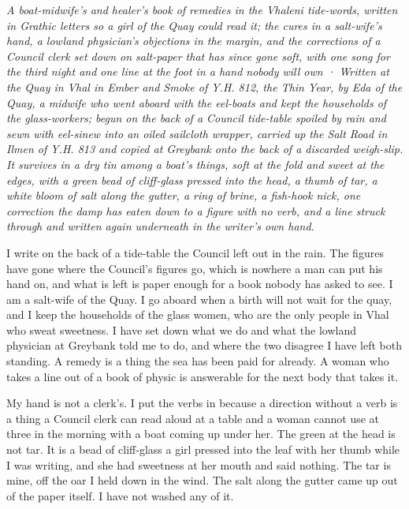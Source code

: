 \documentclass{design/chronicle}
\begin{document}
\clearpage{}
{\centering\FellFont\itshape\footnotesize\color{faded} A boat-midwife’s and healer’s book of remedies in the Vhaleni tide-words, written in Grathic letters so a girl of the Quay could read it; the cures in a salt-wife’s hand, a lowland physician’s objections in the margin, and the corrections of a Council clerk set down on salt-paper that has since gone soft, with one song for the third night and one line at the foot in a hand nobody will own · Written at the Quay in Vhal in Ember and Smoke of Y.H. 812, the Thin Year, by Eda of the Quay, a midwife who went aboard with the eel-boats and kept the households of the glass-workers; begun on the back of a Council tide-table spoiled by rain and sewn with eel-sinew into an oiled sailcloth wrapper, carried up the Salt Road in Ilmen of Y.H. 813 and copied at Greybank onto the back of a discarded weigh-slip. It survives in a dry tin among a boat’s things, soft at the fold and sweet at the edges, with a green bead of cliff-glass pressed into the head, a thumb of tar, a white bloom of salt along the gutter, a ring of brine, a fish-hook nick, one correction the damp has eaten down to a figure with no verb, and a line struck through and written again underneath in the writer’s own hand.\par}\medskip
I write on the back of a tide-table the Council left out in the rain. The figures have gone where the Council’s figures go, which is nowhere a man can put his hand on, and what is left is paper enough for a book nobody has asked to see. I am a salt-wife of the Quay. I go aboard when a birth will not wait for the quay, and I keep the households of the glass women, who are the only people in Vhal who sweat sweetness. I have set down what we do and what the lowland physician at Greybank told me to do, and where the two disagree I have left both standing. A remedy is a thing the sea has been paid for already. A woman who takes a line out of a book of physic is answerable for the next body that takes it.

My hand is not a clerk’s. I put the verbs in because a direction without a verb is a thing a Council clerk can read aloud at a table and a woman cannot use at three in the morning with a boat coming up under her. The green at the head is not tar. It is a bead of cliff-glass a girl pressed into the leaf with her thumb while I was writing, and she had sweetness at her mouth and said nothing. The tar is mine, off the oar I held down in the wind. The salt along the gutter came up out of the paper itself. I have not washed any of it.
\end{document}
